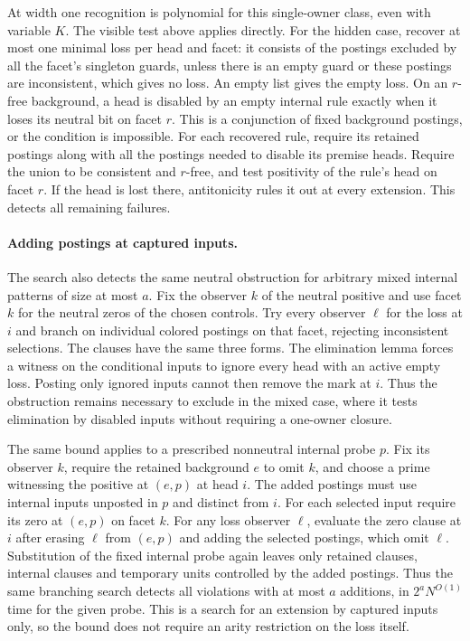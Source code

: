 At width one recognition is polynomial for this
single-owner class, even with variable $K$. The
visible test above applies directly. For the hidden
case, recover at most one minimal loss per head and
facet: it consists of the postings excluded by all
the facet's singleton guards, unless there is an
empty guard or these postings are inconsistent, which
gives no loss. An empty list gives the empty loss.
On an $r$-free background, a head is disabled by an
empty internal rule exactly when it loses its neutral
bit on facet $r$. This is a conjunction of fixed
background postings, or the condition is impossible.
For each recovered rule, require its retained postings
along with all the postings needed to disable its
premise heads. Require the union to be consistent and $r$-free,
and test positivity of the rule's head on facet $r$.
If the head is lost there, antitonicity rules it out
at every extension.
This detects all remaining failures.

\paragraph{Adding postings at captured inputs.}
The search also detects the same neutral obstruction
for arbitrary mixed internal patterns of size at most
$a$. Fix the observer $k$ of the neutral positive and
use facet $k$ for the neutral zeros of the chosen
controls. Try every observer $\ell$ for the loss at
$i$ and branch on individual colored postings on
that facet, rejecting inconsistent
selections. The clauses have the same three forms.
The elimination lemma forces a witness on the
conditional inputs to ignore every head with an active
empty loss. Posting only ignored inputs cannot then
remove the mark at $i$. Thus the obstruction remains
necessary to exclude in the mixed case, where it tests
elimination by disabled inputs without requiring a
one-owner closure.

The same bound applies to a prescribed nonneutral
internal probe $p$. Fix its observer $k$, require the
retained background $e$ to omit $k$, and choose a
prime witnessing the positive at $(e,p)$ at head $i$.
The added postings must use internal inputs unposted
in $p$ and distinct from $i$. For each selected input
require its zero at $(e,p)$ on facet $k$. For any loss
observer $\ell$, evaluate the zero clause at $i$
after erasing $\ell$ from $(e,p)$ and adding the
selected postings, which omit $\ell$. Substitution
of the fixed internal probe again leaves only
retained clauses, internal clauses and temporary
units controlled by the added postings. Thus the
same branching search detects all violations with at
most $a$ additions, in $2^a N^{O(1)}$ time for the
given probe. This is a search for an extension by
captured inputs only, so the bound does not require
an arity restriction on the loss itself.

